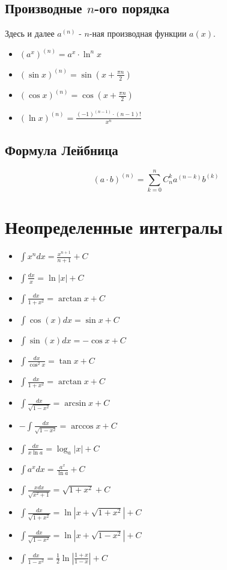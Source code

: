 \documentclass{article}
\begin{document}
	\subsection{Производные $n$-ого порядка}
	Здесь и далее $a^{(n)}$ - $n$-ная производная функции $a(x)$.
	\begin{itemize}
		\item $(a^x)^{(n)}=a^x \cdot \ln^n{x} $
		\item $(\sin{x})^{(n)}=\sin{(x+\frac{\pi n}{2})}$
		\item $(\cos{x})^{(n)}=\cos{(x+\frac{\pi n}{2})}$
		\item $(\ln{x})^{(n)}=\frac{(-1)^{(n-1)}\cdot (n-1)!}{x^n}$
	\end{itemize}
	\subsection{Формула Лейбница}
	$$(a\cdot b)^{(n)}=\sum_{k=0}^n C^k_na^{(n-k)}b^{(k)}$$
	
	\section{Неопределенные интегралы}
	\begin{itemize}
		\item $\int{x^ndx}=\frac{x^{n+1}}{n+1}+C$
		\item $\int \frac{dx}{x} = \ln{|x|} + C$
		\item $\int{\frac{dx}{1+x^2}}=\arctan{x}+C$
		\item $\int{\cos{(x)}}dx = \sin{x} + C$
		\item $\int{\sin{(x)}}dx = - \cos{x} + C$
		\item $\int\frac{dx}{\cos^2{x}} = \tan{x} +C$
		\item $\int\frac{dx}{1+x^2}=\arctan{x} +C$
		\item $\int\frac{dx}{\sqrt{1-x^2}} = \arcsin x +C$
		\item $-\int\frac{dx}{\sqrt{1-x^2}} = \arccos x +C$
		\item $\int\frac{dx}{x\ln{a}} = \log_a{|x|}+C$                                                                                                     
		\item $\int a^x dx= \frac{a^x}{\ln{a}}+C$
		\item $\int\frac{x dx}{\sqrt{x^2+1}} = \sqrt{1+x^2}+C$
		\item $\int\frac{dx}{\sqrt{1+x^2}} = \ln|x+\sqrt{1+x^2}|+C$
		\item $\int\frac{dx}{\sqrt{1-x^2}} = \ln|x+\sqrt{1-x^2}|+C$

		\item $\int\frac{dx}{1-x^2} = \frac{1}{2}\ln\left|\frac{1+x}{1-x}\right| + C $

	\end{itemize}

	
\end{document}
